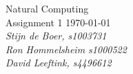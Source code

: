\documentclass{article}
\date{\today}
\begin{document}
\begin{flushright}
Natural Computing \\ 
Assignment 1 \today \\ 
\emph{Stijn de Boer, \textit{s1003731} \\ Ron Hommelsheim \textit{s1000522} \\  David Leeftink, \textit{s4496612} }\\\end{flushright}

 


\end{document}
